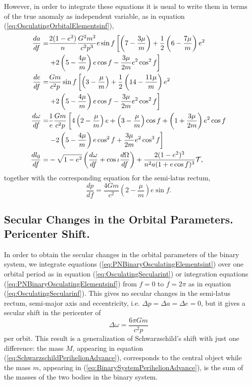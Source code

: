 However, in order to integrate these equations it is usual to write them in terms of the true anomaly as independent variable, as in equation (\ref{eq:OsculatingOrbitalElementsinf}),
\begin{subequations}\label{eq:PNBinaryOsculatingElementsinf}
\begin{align}
\frac{da}{df} = &\frac{2(1-e^2)}{n} \frac{G^2m^2}{c^2 p^3} e \sin f \left[ \left( 7 - \frac{3\mu}{m} \right) + \frac{1}{2} \left( 6 - \frac{7\mu}{m} \right) e^2 \right. \notag \\
& \left. + 2 \left( 5 - \frac{4\mu}{m} \right) e \cos f - \frac{3\mu}{2m} e^2 \cos ^2 f \right] \\
\frac{de}{df} = &  \frac{Gm}{c^2 p}  \sin f  \left[ \left( 3 - \frac{\mu}{m} \right) + \frac{1}{2} \left( 14 - \frac{11\mu}{m} \right) e^2 \right. \notag \\
& \left. + 2 \left( 5 - \frac{4\mu}{m} \right) e \cos f - \frac{3\mu}{2m} e^2 \cos ^2 f \right] \\
\frac{d\omega}{df} =& \frac{1}{e}  \frac{Gm}{c^2 p} \left[ 4\left( 2 - \frac{\mu}{m} \right)e + \left( 3 - \frac{\mu}{m} \right) \cos f + \left( 1 + \frac{3\mu}{2m} \right) e^2 \cos f \right. \notag \\
& \left.  -2 \left( 5 - \frac{4\mu}{m} \right) e \cos^2 f + \frac{3\mu}{2m} e^2 \cos ^3 f \right] \\
\frac{dl_0}{df} = & -\sqrt{1-e^2} \left( \frac{d\omega}{df} + \cos \iota \frac{d\Omega}{df} \right) + \frac{2 (1-e^2)^3}{n^2 a (1+e \cos f)^3} \mathcal{T}  ,
\end{align}
\end{subequations}
together with the corresponding equation for the semi-latus rectum,
\begin{equation}
\frac{dp}{df} = \frac{4Gm}{c^2} \left( 2 - \frac{\mu}{m} \right)  e \sin f.
\end{equation}

\subsection{Secular Changes in the Orbital Parameters. Pericenter Shift.}

In order to obtain the secular changes in the orbital parameters of the binary system, we integrate equations (\ref{eq:PNBinaryOsculatingElementsint}) over one orbital period as in equation (\ref{eq:OsculatingSecularint}) or integration equations (\ref{eq:PNBinaryOsculatingElementsinf}) from $f=0$ to $f=2\pi$ as in equation (\ref{eq:OsculatingSecularinf}). This gives no secular changes in the semi-latus rectum, semi-major axis and eccentricity, i.e. $\Delta p = \Delta a = \Delta e = 0$, but it gives a secular shift in the pericenter of
\begin{equation}
\Delta \omega =  \frac{6 \pi Gm}{c^2 p} \label{eq:BinarySystemPerihelionAdvance}
\end{equation} 
per orbit. This result is a generalization of Schwarzschild's shift with just one difference: the mass $M$, appearing in equation (\ref{eq:SchwarzschildPerihelionAdvance}), corresponds to the central object while the mass $m$, appearing in (\ref{eq:BinarySystemPerihelionAdvance}), is the sum of the masses of the two bodies in the binary system.

